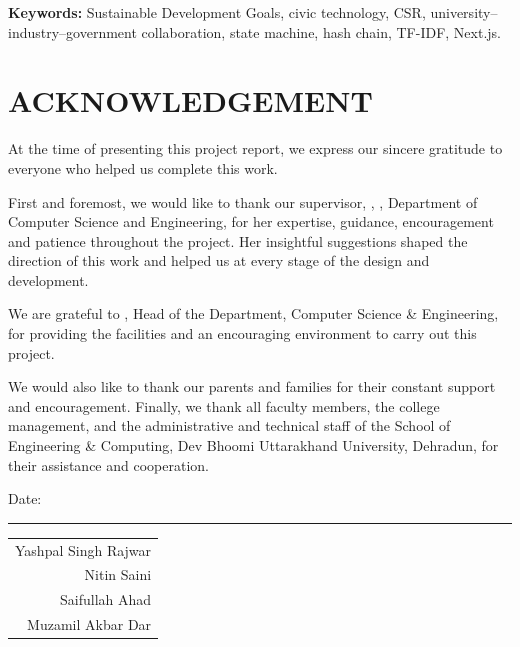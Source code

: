 \noindent\textbf{Keywords:} Sustainable Development Goals, civic technology, CSR, university--industry--government collaboration, state machine, hash chain, TF-IDF, Next.js.

\chapter*{ACKNOWLEDGEMENT}
At the time of presenting this project report, we express our sincere gratitude to everyone who helped us complete this work.

First and foremost, we would like to thank our supervisor, \textbf{\guide}, \guidedesignation, Department of Computer Science and Engineering, for her expertise, guidance, encouragement and patience throughout the project. Her insightful suggestions shaped the direction of this work and helped us at every stage of the design and development.

We are grateful to \textbf{\hod}, Head of the Department, Computer Science \& Engineering, for providing the facilities and an encouraging environment to carry out this project.

We would also like to thank our parents and families for their constant support and encouragement. Finally, we thank all faculty members, the college management, and the administrative and technical staff of the School of Engineering \& Computing, Dev Bhoomi Uttarakhand University, Dehradun, for their assistance and cooperation.

\vspace{1cm}
\noindent Date: \rule{3cm}{0.4pt}\hfill
\begin{tabular}[t]{r}
Yashpal Singh Rajwar\\ Nitin Saini\\ Saifullah Ahad\\ Muzamil Akbar Dar
\end{tabular}

\cleardoublepage
{}
\tableofcontents
\cleardoublepage
{}
\listoffigures
\cleardoublepage
{}
\listoftables
